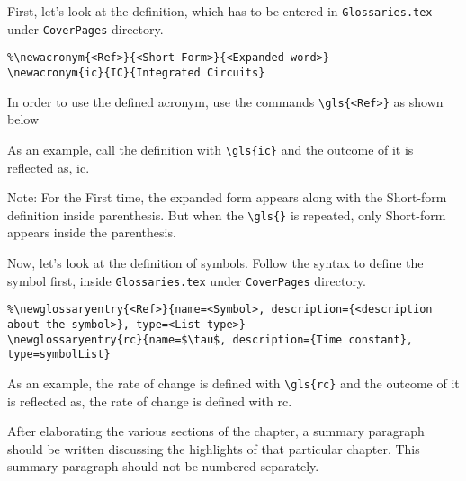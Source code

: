 
First, let's look at the definition, which has to be entered in \texttt{Glossaries.tex} under \texttt{CoverPages} directory.
\begin{verbatim}
%\newacronym{<Ref>}{<Short-Form>}{<Expanded word>}
\newacronym{ic}{IC}{Integrated Circuits}
\end{verbatim}
In order to use the defined acronym, use the commands \verb|\gls{<Ref>}| as shown below

As an example, call the definition with \verb|\gls{ic}| and the outcome of it is reflected as, \gls{ic}.

Note: For the First time, the expanded form appears along with the Short-form definition inside parenthesis. But when the \verb|\gls{}| is repeated, only Short-form appears inside the parenthesis.

Now, let's look at the definition of symbols. Follow the syntax to define the symbol first, inside \texttt{Glossaries.tex} under \texttt{CoverPages} directory.
\begin{verbatim}
%\newglossaryentry{<Ref>}{name=<Symbol>, description={<description about the symbol>}, type=<List type>}
\newglossaryentry{rc}{name=$\tau$, description={Time constant}, type=symbolList}
\end{verbatim}

As an example, the rate of change is defined with \verb|\gls{rc}| and the outcome of it is reflected as, the rate of change is defined with \gls{rc}.

\vspace{0.75cm}

After elaborating the various sections of the chapter, a summary paragraph should be written discussing the highlights of that particular chapter. This summary paragraph should not be numbered separately.  